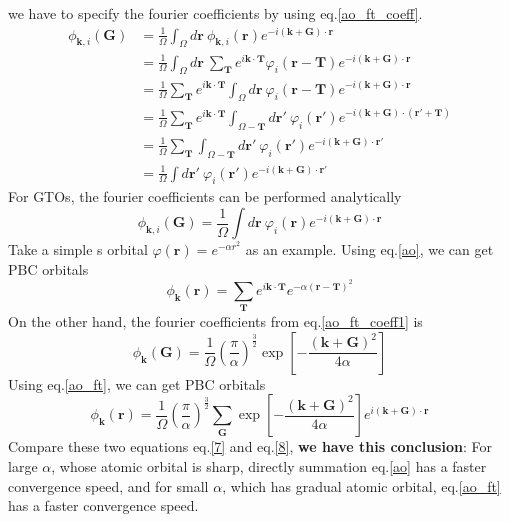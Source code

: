 \documentclass{article}
\begin{document}
    we have to specify the fourier coefficients by using eq.\eqref{ao_ft_coeff}.
    \begin{align*}
        \phi_{\textbf{k},i}(\textbf{G}) &= \frac{1}{\Omega}\int_\Omega d\textbf{r}\ \phi_{\textbf{k},i}(\textbf{r})e^{-i(\textbf{k}+\textbf{G})\cdot\textbf{r}}\\
        &= \frac{1}{\Omega}\int_\Omega d\textbf{r}\ \sum_{\textbf{T}}e^{i\textbf{k}\cdot\textbf{T}}\varphi_i(\textbf{r}-\textbf{T})e^{-i(\textbf{k}+\textbf{G})\cdot\textbf{r}}\\
        &= \frac{1}{\Omega}\sum_{\textbf{T}}e^{i\textbf{k}\cdot\textbf{T}}\int_\Omega d\textbf{r}\ \varphi_i(\textbf{r}-\textbf{T})e^{-i(\textbf{k}+\textbf{G})\cdot\textbf{r}}\\
        &= \frac{1}{\Omega}\sum_{\textbf{T}}e^{i\textbf{k}\cdot\textbf{T}}
            \int_{\Omega-\textbf{T}} d\textbf{r}'\ \varphi_i(\textbf{r}')e^{-i(\textbf{k}+\textbf{G})\cdot(\textbf{r}'+\textbf{T})}\\
        &= \frac{1}{\Omega}\sum_{\textbf{T}}\int_{\Omega-\textbf{T}} d\textbf{r}'\ \varphi_i(\textbf{r}')e^{-i(\textbf{k}+\textbf{G})\cdot\textbf{r}'}\\
        &= \frac{1}{\Omega}\int d\textbf{r}'\ \varphi_i(\textbf{r}')e^{-i(\textbf{k}+\textbf{G})\cdot\textbf{r}'}
    \end{align*}
    For GTOs, the fourier coefficients can be performed analytically
    \begin{equation}
        \phi_{\textbf{k},i}(\textbf{G}) = \frac{1}{\Omega}\int d\textbf{r}\ \varphi_i(\textbf{r})e^{-i(\textbf{k}+\textbf{G})\cdot\textbf{r}}\label{ao_ft_coeff1}
    \end{equation}
    Take a simple s orbital $\varphi(\textbf{r})=e^{-\alpha r^2}$ as an example.
    Using eq.\eqref{ao}, we can get PBC orbitals
    \begin{equation}
        \phi_{\textbf{k}}(\textbf{r}) = \sum_{\textbf{T}}e^{i\textbf{k}\cdot\textbf{T}}e^{-\alpha (\textbf{r}-\textbf{T})^2}\label{7}
    \end{equation}
    On the other hand, the fourier coefficients from eq.\eqref{ao_ft_coeff1} is
    \begin{equation*}
        \phi_{\textbf{k}}(\textbf{G}) = \frac{1}{\Omega}\left(\frac{\pi}{\alpha}\right)^{\frac{3}{2}}\exp\left[-\frac{(\textbf{k}+\textbf{G})^2}{4\alpha}\right]
    \end{equation*}
    Using eq.\eqref{ao_ft}, we can get PBC orbitals
    \begin{equation}
        \phi_{\textbf{k}}(\textbf{r}) = \frac{1}{\Omega}\left(\frac{\pi}{\alpha}\right)^{\frac{3}{2}}\sum_{\textbf{G}}
        \exp\left[-\frac{(\textbf{k}+\textbf{G})^2}{4\alpha}\right]e^{i(\textbf{k}+\textbf{G})\cdot\textbf{r}}\label{8}
    \end{equation}
    Compare these two equations eq.\eqref{7} and eq.\eqref{8}, \textbf{we have this conclusion}:
    For large $\alpha$, whose atomic orbital is sharp, directly summation eq.\eqref{ao} has a faster convergence speed,
    and for small $\alpha$, which has gradual atomic orbital, eq.\eqref{ao_ft} has a faster convergence speed.
    
\end{document}
